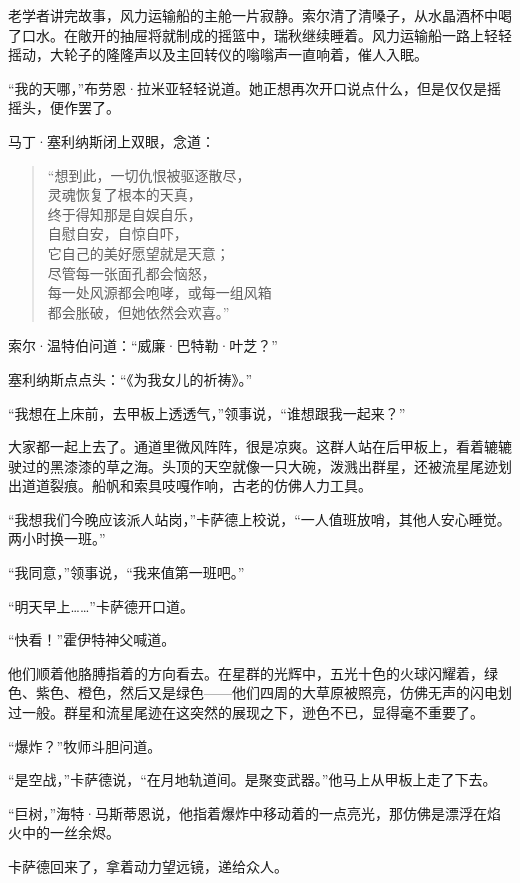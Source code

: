 \documentclass[AutoFakeBold=true]{book}
\begin{document}
老学者讲完故事，风力运输船的主舱一片寂静。索尔清了清嗓子，从水晶酒杯中喝了口水。在敞开的抽屉将就制成的摇篮中，瑞秋继续睡着。风力运输船一路上轻轻摇动，大轮子的隆隆声以及主回转仪的嗡嗡声一直响着，催人入眠。

``我的天哪，''布劳恩·拉米亚轻轻说道。她正想再次开口说点什么，但是仅仅是摇摇头，便作罢了。

马丁·塞利纳斯闭上双眼，念道：

\begin{quote}
	{\kaishu ``想到此，一切仇恨被驱逐散尽，\\
	灵魂恢复了根本的天真，\\
	终于得知那是自娱自乐，\\
	自慰自安，自惊自吓，\\
	它自己的美好愿望就是天意；\\
	尽管每一张面孔都会恼怒，\\
	每一处风源都会咆哮，或每一组风箱\\
	都会胀破，但她依然会欢喜。''}
\end{quote}

索尔·温特伯问道：``威廉·巴特勒·叶芝？''

塞利纳斯点点头：``《为我女儿的祈祷》。''

``我想在上床前，去甲板上透透气，''领事说，``谁想跟我一起来？''

大家都一起上去了。通道里微风阵阵，很是凉爽。这群人站在后甲板上，看着辘辘驶过的黑漆漆的草之海。头顶的天空就像一只大碗，泼溅出群星，还被流星尾迹划出道道裂痕。船帆和索具吱嘎作响，古老的仿佛人力工具。

``我想我们今晚应该派人站岗，''卡萨德上校说，``一人值班放哨，其他人安心睡觉。两小时换一班。''

``我同意，''领事说，``我来值第一班吧。''

``明天早上……''卡萨德开口道。

``快看！''霍伊特神父喊道。

他们顺着他胳膊指着的方向看去。在星群的光辉中，五光十色的火球闪耀着，绿色、紫色、橙色，然后又是绿色——他们四周的大草原被照亮，仿佛无声的闪电划过一般。群星和流星尾迹在这突然的展现之下，逊色不已，显得毫不重要了。

``爆炸？''牧师斗胆问道。

``是空战，''卡萨德说，``在月地轨道间。是聚变武器。''他马上从甲板上走了下去。

``巨树，''海特·马斯蒂恩说，他指着爆炸中移动着的一点亮光，那仿佛是漂浮在焰火中的一丝余烬。

卡萨德回来了，拿着动力望远镜，递给众人。
\end{document}
